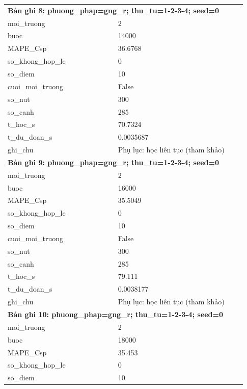 \begin{longtable}{p{0.43\linewidth}p{0.50\linewidth}}
\midrule
\multicolumn{2}{p{0.95\linewidth}}{\textbf{Bản ghi 8: phuong\_phap=gng\_r; thu\_tu=1-2-3-4; seed=0}} \\
moi\_\allowbreak truong & 2 \\
buoc & 14000 \\
MAPE\_\allowbreak Csp & 36.6768 \\
so\_\allowbreak khong\_\allowbreak hop\_\allowbreak le & 0 \\
so\_\allowbreak diem & 10 \\
cuoi\_\allowbreak moi\_\allowbreak truong & False \\
so\_\allowbreak nut & 300 \\
so\_\allowbreak canh & 285 \\
t\_\allowbreak hoc\_\allowbreak s & 70.7324 \\
t\_\allowbreak du\_\allowbreak doan\_\allowbreak s & 0.0035687 \\
ghi\_\allowbreak chu & Phụ lục: học liên tục (tham khảo) \\
\midrule
\multicolumn{2}{p{0.95\linewidth}}{\textbf{Bản ghi 9: phuong\_phap=gng\_r; thu\_tu=1-2-3-4; seed=0}} \\
moi\_\allowbreak truong & 2 \\
buoc & 16000 \\
MAPE\_\allowbreak Csp & 35.5049 \\
so\_\allowbreak khong\_\allowbreak hop\_\allowbreak le & 0 \\
so\_\allowbreak diem & 10 \\
cuoi\_\allowbreak moi\_\allowbreak truong & False \\
so\_\allowbreak nut & 300 \\
so\_\allowbreak canh & 285 \\
t\_\allowbreak hoc\_\allowbreak s & 79.111 \\
t\_\allowbreak du\_\allowbreak doan\_\allowbreak s & 0.0038177 \\
ghi\_\allowbreak chu & Phụ lục: học liên tục (tham khảo) \\
\midrule
\multicolumn{2}{p{0.95\linewidth}}{\textbf{Bản ghi 10: phuong\_phap=gng\_r; thu\_tu=1-2-3-4; seed=0}} \\
moi\_\allowbreak truong & 2 \\
buoc & 18000 \\
MAPE\_\allowbreak Csp & 35.453 \\
so\_\allowbreak khong\_\allowbreak hop\_\allowbreak le & 0 \\
so\_\allowbreak diem & 10 \\

\end{longtable}
